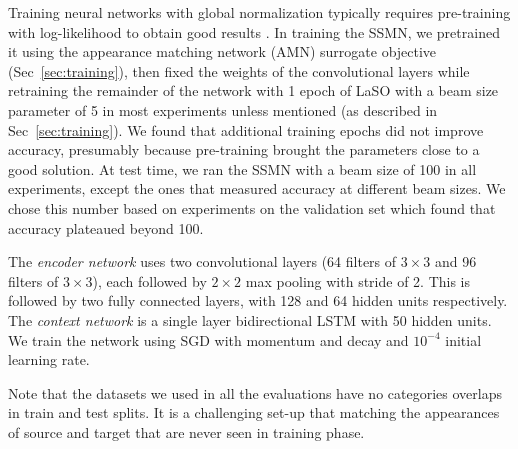 \documentclass[10pt,twocolumn,letterpaper]{article}
\begin{document}
Training neural networks with global normalization typically requires pre-training with log-likelihood to obtain good results \cite{Andor2016,Wiseman2016SequencetoSequenceLA}. In training the SSMN, we pretrained it using the appearance matching network (AMN) surrogate objective (Sec~\ref{sec:training}), then fixed the weights of the convolutional layers while retraining the remainder of the network with 1 epoch of LaSO with a beam size parameter of 5 in most experiments unless mentioned (as described in Sec~\ref{sec:training}). We found that additional training epochs did not improve accuracy, presumably because pre-training brought the parameters close to a good solution. At test time, we ran the SSMN with a beam size of 100 in all experiments, except the ones that measured accuracy at different beam sizes. We chose this number based on experiments on the validation set which found that accuracy plateaued beyond 100.

The \emph{encoder network} uses two convolutional layers (64 filters of $3 \times 3$ and 96 filters of $3 \times 3$), each followed by $2 \times 2$ max pooling with stride of 2. This is followed by two fully connected layers, with 128 and 64 hidden units respectively. The \emph{context network} is a single layer bidirectional LSTM with 50 hidden units. We train the network using SGD with momentum and decay and $10^{-4}$ initial learning rate.

Note that the datasets we used in all the evaluations have no categories overlaps in train and test splits. It is a challenging set-up that matching the appearances of source and target that are never seen in training phase.
\end{document}
